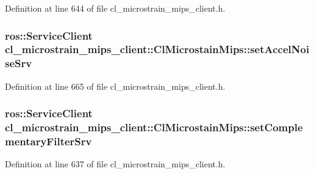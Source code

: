 Definition at line 644 of file cl\+\_\+microstrain\+\_\+mips\+\_\+client.\+h.

\subsubsection[{\texorpdfstring{set\+Accel\+Noise\+Srv}{setAccelNoiseSrv}}]{\setlength{\rightskip}{0pt plus 5cm}ros\+::\+Service\+Client cl\+\_\+microstrain\+\_\+mips\+\_\+client\+::\+Cl\+Microstain\+Mips\+::set\+Accel\+Noise\+Srv\hspace{0.3cm}{\ttfamily [protected]}}\hypertarget{classcl__microstrain__mips__client_1_1ClMicrostainMips_a65dbc3c556c40293cc3e188bfd632243}{}\label{classcl__microstrain__mips__client_1_1ClMicrostainMips_a65dbc3c556c40293cc3e188bfd632243}


Definition at line 665 of file cl\+\_\+microstrain\+\_\+mips\+\_\+client.\+h.

\subsubsection[{\texorpdfstring{set\+Complementary\+Filter\+Srv}{setComplementaryFilterSrv}}]{\setlength{\rightskip}{0pt plus 5cm}ros\+::\+Service\+Client cl\+\_\+microstrain\+\_\+mips\+\_\+client\+::\+Cl\+Microstain\+Mips\+::set\+Complementary\+Filter\+Srv\hspace{0.3cm}{\ttfamily [protected]}}\hypertarget{classcl__microstrain__mips__client_1_1ClMicrostainMips_a5b6fa2b712961f36c2a2603315dc4751}{}\label{classcl__microstrain__mips__client_1_1ClMicrostainMips_a5b6fa2b712961f36c2a2603315dc4751}


Definition at line 637 of file cl\+\_\+microstrain\+\_\+mips\+\_\+client.\+h.

